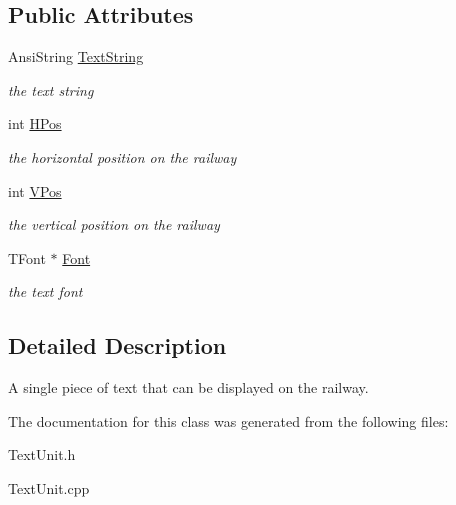 \subsection*{Public Attributes}
\begin{DoxyCompactItemize}
\item 
\mbox{\label{class_t_text_item_a4c25a60852b8493f06d26e64241aa98f}} 
Ansi\+String \mbox{\hyperlink{class_t_text_item_a4c25a60852b8493f06d26e64241aa98f}{Text\+String}}
\begin{DoxyCompactList}\small\item\em the text string \end{DoxyCompactList}\item 
\mbox{\label{class_t_text_item_a1be1010d3eed8002ab893103a43ffc7b}} 
int \mbox{\hyperlink{class_t_text_item_a1be1010d3eed8002ab893103a43ffc7b}{H\+Pos}}
\begin{DoxyCompactList}\small\item\em the horizontal position on the railway \end{DoxyCompactList}\item 
\mbox{\label{class_t_text_item_a7fc4c3a7d8583931e2ac595006550f9c}} 
int \mbox{\hyperlink{class_t_text_item_a7fc4c3a7d8583931e2ac595006550f9c}{V\+Pos}}
\begin{DoxyCompactList}\small\item\em the vertical position on the railway \end{DoxyCompactList}\item 
\mbox{\label{class_t_text_item_a0960b6aa95ed04a4e7bc9131dd6e879e}} 
T\+Font $\ast$ \mbox{\hyperlink{class_t_text_item_a0960b6aa95ed04a4e7bc9131dd6e879e}{Font}}
\begin{DoxyCompactList}\small\item\em the text font \end{DoxyCompactList}\end{DoxyCompactItemize}


\subsection{Detailed Description}
A single piece of text that can be displayed on the railway. 

The documentation for this class was generated from the following files\+:\begin{DoxyCompactItemize}
\item 
Text\+Unit.\+h\item 
Text\+Unit.\+cpp\end{DoxyCompactItemize}
